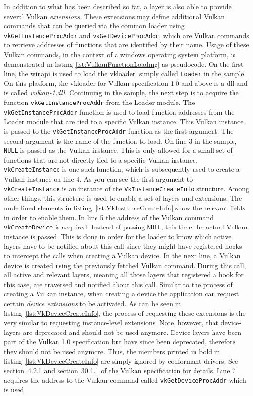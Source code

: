     In addition to what has been described so far, a layer is also able to provide several Vulkan \textit{extensions}. These extensions may define additional Vulkan commands that can be queried via the common loader using \lstinline{vkGetInstanceProcAddr} and \lstinline{vkGetDeviceProcAddr}, which are Vulkan commands to retrieve addresses of functions that are identified by their name. Usage of these Vulkan commands, in the context of a \gls{windows} operating system platform, is demonstrated in listing \ref{lst:VulkanFunctionLoading} as pseudocode. On the first line, the \gls{winapi} is used to load the \gls{vkloader}, simply called \lstinline{Loader} in the sample. On this platform, the \gls{vkloader} for Vulkan specification 1.0 and above is a \gls{dll} and is called \textit{vulkan-1.dll}. Continuing in the sample, the next step is to acquire the function \lstinline{vkGetInstanceProcAddr} from the Loader module. The \lstinline{vkGetInstanceProcAddr} function is used to load function addresses from the Loader module that are tied to a specific Vulkan instance. This Vulkan instance is passed to the \lstinline{vkGetInstanceProcAddr} function as the first argument. The second argument is the name of the function to load. On line 3 in the sample, \lstinline{NULL} is passed as the Vulkan instance. This is only allowed for a small set of functions that are not directly tied to a specific Vulkan instance. \lstinline{vkCreateInstance} is one such function, which is subsequently used to create a Vulkan instance on line 4. As you can see the first argument to \lstinline{vkCreateInstance} is an instance of the \lstinline{VkInstanceCreateInfo} structure. Among other things, this structure is used to enable a set of layers and extensions. The underlined elements in listing~\ref{lst:VkInstanceCreateInfo} show the relevant fields in order to enable them. In line 5 the address of the Vulkan command \lstinline{vkCreateDevice} is acquired. Instead of passing \lstinline{NULL}, this time the actual Vulkan instance is passed. This is done in order for the loader to know which active layers have to be notified about this call since they might have registered hooks to intercept the calls when creating a Vulkan device. In the next line, a Vulkan device is created using the previously fetched Vulkan command. During this call, all active and relevant layers, meaning all those layers that registered a hook for this case, are traversed and notified about this call. Similar to the process of creating a Vulkan instance, when creating a device the application can request certain \textit{device extensions} to be activated. As can be seen in listing~\ref{lst:VkDeviceCreateInfo}, the process of requesting these extensions is the very similar to requesting instance-level extensions. Note, however, that device-layers are deprecated and should not be used anymore. Device layers have been part of the Vulkan 1.0 specification but have since been deprecated, therefore they should not be used anymore. Thus, the members printed in bold in listing~\ref{lst:VkDeviceCreateInfo} are simply ignored by conformant \glspl{driver}. See section~4.2.1 and section~30.1.1 of the Vulkan specification\cite{vkspec} for details. Line 7 acquires the address to the Vulkan command called \lstinline{vkGetDeviceProcAddr} which is used 